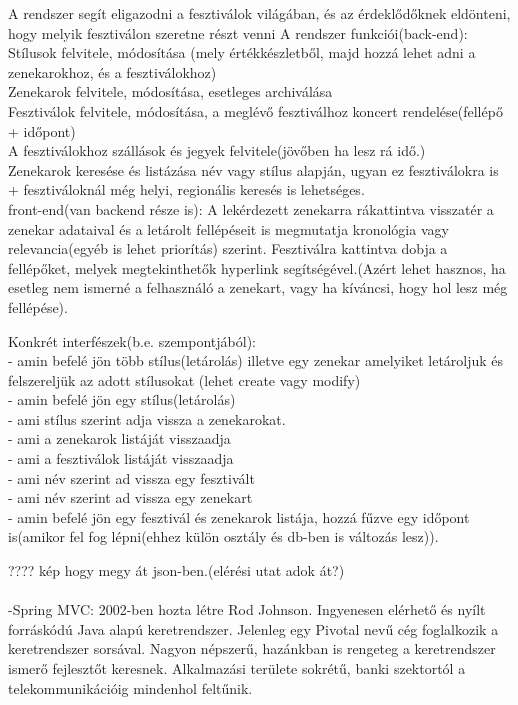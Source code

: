 \documentclass[11pt]{article}
\begin{document}
A rendszer segít eligazodni a fesztiválok világában, és az érdeklődőknek eldönteni, hogy melyik fesztiválon szeretne részt venni
A rendszer funkciói(back-end):\\
Stílusok felvitele, módosítása (mely értékkészletből, majd hozzá lehet adni a zenekarokhoz, és a fesztiválokhoz)\\
Zenekarok felvitele, módosítása, esetleges archiválása\\
Fesztiválok felvitele, módosítása, a meglévő fesztiválhoz koncert rendelése(fellépő + időpont)\\
A fesztiválokhoz szállások és jegyek felvitele(jövőben ha lesz rá idő.)\\
Zenekarok keresése és listázása név vagy stílus alapján, ugyan ez fesztiválokra is + fesztiváloknál még helyi, regionális keresés is lehetséges.\\

front-end(van backend része is):
A lekérdezett zenekarra rákattintva visszatér a zenekar adataival és a letárolt fellépéseit is megmutatja kronológia vagy relevancia(egyéb is lehet priorítás) szerint.
Fesztiválra kattintva dobja a fellépőket, melyek megtekinthetők hyperlink segítségével.(Azért lehet hasznos, ha esetleg nem ismerné a felhasználó a zenekart, vagy ha kíváncsi, hogy hol lesz még fellépése).

Konkrét interfészek(b.e. szempontjából):
\\- amin befelé jön több stílus(letárolás) illetve egy zenekar amelyiket letároljuk és felszereljük az adott stílusokat (lehet create vagy modify)
\\- amin befelé jön egy stílus(letárolás)
\\- ami stílus szerint adja vissza a zenekarokat.
\\- ami a zenekarok listáját visszaadja
\\- ami a fesztiválok listáját visszaadja
\\- ami név szerint ad vissza egy fesztivált
\\- ami név szerint ad vissza egy zenekart
\\- amin befelé jön egy fesztivál és zenekarok listája, hozzá fűzve egy időpont is(amikor fel fog lépni(ehhez külön osztály és db-ben is változás lesz)).
 
????
kép hogy megy át json-ben.(elérési utat adok át?)
\\
\\ -Spring MVC: 2002-ben hozta létre Rod Johnson. Ingyenesen elérhető és nyílt forráskódú Java alapú keretrendszer. Jelenleg egy Pivotal nevű cég foglalkozik a keretrendszer sorsával. Nagyon népszerű, hazánkban is rengeteg a keretrendszer ismerő fejlesztőt keresnek. Alkalmazási területe sokrétű, banki szektortól a telekommunikációig mindenhol feltűnik.
\end{document}
